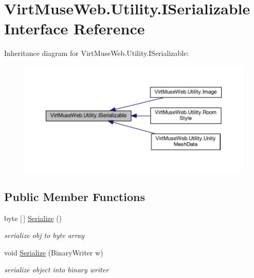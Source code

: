 \hypertarget{interface_virt_muse_web_1_1_utility_1_1_i_serializable}{}\section{Virt\+Muse\+Web.\+Utility.\+I\+Serializable Interface Reference}
\label{interface_virt_muse_web_1_1_utility_1_1_i_serializable}


Inheritance diagram for Virt\+Muse\+Web.\+Utility.\+I\+Serializable\+:
\nopagebreak
\begin{figure}[H]
\begin{center}
\leavevmode
\includegraphics[width=350pt]{interface_virt_muse_web_1_1_utility_1_1_i_serializable__inherit__graph}
\end{center}
\end{figure}
\subsection*{Public Member Functions}
\begin{DoxyCompactItemize}
\item 
byte \mbox{[}$\,$\mbox{]} \mbox{\hyperlink{interface_virt_muse_web_1_1_utility_1_1_i_serializable_ab466c2a156753c658cff1e073606e9bd}{Serialize}} ()
\begin{DoxyCompactList}\small\item\em serialize obj to byte array \end{DoxyCompactList}\item 
void \mbox{\hyperlink{interface_virt_muse_web_1_1_utility_1_1_i_serializable_a99aed8cf41a4ed3ff1ccbedf84d89291}{Serialize}} (Binary\+Writer w)
\begin{DoxyCompactList}\small\item\em serialize object into binary writer \end{DoxyCompactList}\end{DoxyCompactItemize}


